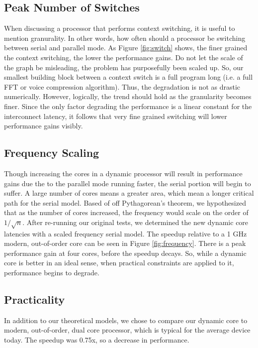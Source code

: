 \subsection{Peak Number of Switches}
When discussing a processor that performs context switching, it is useful to mention granurality. In other words, how often should a processor be switching between serial and parallel mode. As Figure \ref{fig:switch} shows, the finer grained the context switching, the lower the performance gains. Do not let the scale of the graph be misleading, the problem has purposefully been scaled up. So, our smallest building block between a context switch is a full program long (i.e. a full FFT or voice compression algorithm). Thus, the degradation is not as drastic numerically. However, logically, the trend should hold as the granularity becomes finer. Since the only factor degrading the performance is a linear constant for the interconnect latency, it follows that very fine grained switching will lower performance gains visibly.

\subsection{Frequency Scaling}
Though increasing the cores in a dynamic processor will result in performance gains due the to the parallel mode running faster, the serial portion will begin to suffer. A large number of cores means a greater area, which mean a longer critical path for the serial model. Based of off Pythagorean's theorem, we hypothesized that as the number of cores increased, the frequency would scale on the order of $1 / \sqrt{n}$. After re-running our original tests, we determined the new dynamic core latencies with a scaled frequency serial model. The speedup relative to a 1 GHz modern, out-of-order core can be seen in Figure \ref{fig:frequency}. There is a peak performance gain at four cores, before the speedup decays. So, while a dynamic core is better in an ideal sense, when practical constraints are applied to it, performance begins to degrade.

\subsection{Practicality}
In addition to our theoretical models, we chose to compare our dynamic core to modern, out-of-order, dual core processor, which is typical for the average device today. The speedup was 0.75x, so a decrease in performance.